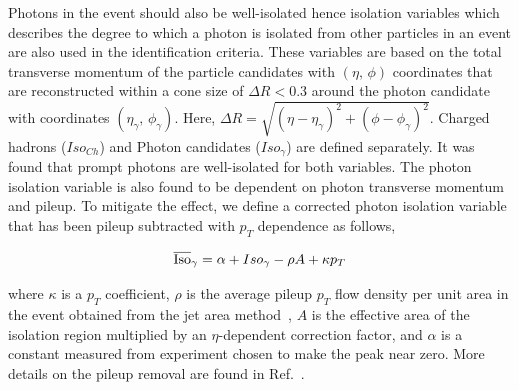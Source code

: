 Photons in the event should also be well-isolated hence isolation variables which describes the degree to which a photon is isolated from other particles in an event are also used in the identification criteria. These variables are based on the total transverse momentum of the particle candidates with $(\eta,\,\phi)$ coordinates that are reconstructed within a cone size of $\Delta R < 0.3$ around the photon candidate with coordinates $(\eta_\gamma,\,\phi_\gamma)$. Here, $\Delta R = \sqrt{(\eta - \eta_\gamma)^2 +(\phi-\phi_\gamma)^2}$. Charged hadrons ($Iso_{Ch}$) and Photon candidates ($Iso_{\gamma}$) are defined separately. It was found that prompt photons are well-isolated for both variables. The photon isolation variable is also found to be dependent on photon transverse momentum and pileup. To mitigate the effect, we define a corrected photon isolation variable that has been pileup subtracted with $p_{T}$ dependence as follows, 

\begin{equation}
 \overline{\mbox{Iso}}_\gamma = \alpha + Iso_{\gamma} - \rho A + \kappa p_{T}  
\end{equation}

where $\kappa$ is a $p_{T}$ coefficient, $\rho$ is the average pileup $p_{T}$ flow density per unit area in the event obtained from the jet area method~\cite{Cacciari:2008gp, Cacciari:2011ma}, $A$ is the effective area of the isolation region multiplied by an $\eta$-dependent correction factor, and $\alpha$ is a constant measured from experiment chosen to make the \corphoiso peak near zero. More details on the pileup removal are found in Ref.~\cite{CMS:2020ebo}.

 
